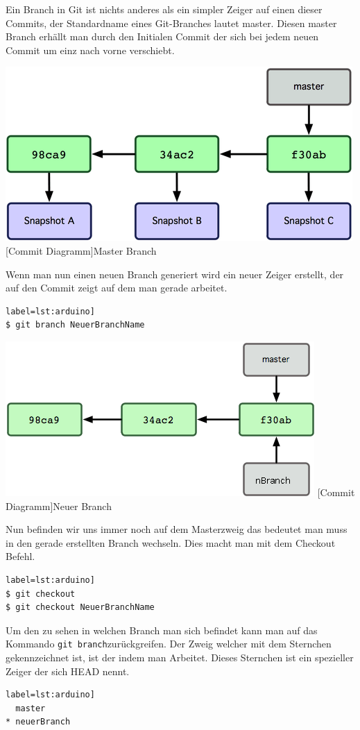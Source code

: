 \documentclass[12pt,a4paper,bibliography=totocnumbered,listof=totocnumbered]{scrartcl}
\begin{document}
Ein Branch in Git ist nichts anderes als ein simpler Zeiger auf einen dieser Commits, der Standardname eines Git-Branches lautet master. Diesen master Branch erhällt man durch den Initialen Commit der sich bei jedem neuen Commit um einz nach vorne verschiebt.
\newline
\vspace{2em}
\begin{minipage}{\linewidth}
	\centering
	\includegraphics[width=0.6\linewidth]{Bilder/master.png}
	[Commit Diagramm]{Master Branch\footnotemark }
	\label{fig:gitspeichern}
\end{minipage} 

Wenn man nun einen neuen Branch generiert wird ein neuer Zeiger erstellt, der auf den Commit zeigt auf dem man gerade arbeitet.

\begin{lstlisting}[caption=Branch Befehl] label=lst:arduino]
$ git branch NeuerBranchName
\end{lstlisting}

\newline

\vspace{2em}
\begin{minipage}{\linewidth}
	\centering
	\includegraphics[width=0.6\linewidth]{Bilder/nbranch.png}
	[Commit Diagramm]{Neuer Branch\footnotemark }
	\label{fig:gitspeichern}
\end{minipage}

Nun befinden wir uns immer noch auf dem Masterzweig das bedeutet man muss in den gerade erstellten Branch wechseln.
Dies macht man mit dem Checkout Befehl.
\begin{lstlisting}[caption=Branch Befehl] label=lst:arduino]
$ git checkout 
$ git checkout NeuerBranchName
\end{lstlisting}
Um den zu sehen in welchen Branch man sich befindet kann man auf das Kommando \lstinline|git branch|zurückgreifen. Der Zweig welcher mit dem Sternchen gekennzeichnet ist, ist der indem man Arbeitet. Dieses Sternchen ist ein spezieller Zeiger der sich HEAD nennt. 
\begin{lstlisting}[caption=Aktuellen Branch prüfen] label=lst:arduino]
  master
* neuerBranch
\end{lstlisting}
\end{document}
